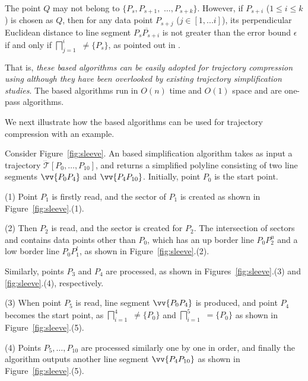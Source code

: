 The point $Q$ may not belong to $\{P_{s}, P_{s+1},$ $\ldots, P_{s+k}\}$.
However, if $P_{s+i}$ ($1\le i\le k$) is chosen as $Q$, then
for any data point $P_{s+j}$ ($j \in [1, ... i]$), its perpendicular Euclidean distance to
line segment $\overline{P_sP_{s+i}}$ is not greater than the error bound $\epsilon$ if and only if $\bigsqcap_{j=1}^{i}$ $\ne \{P_s\}$, as pointed out in \cite{Zhao:Sleeve}.

That is, {\em these \cia based algorithms can be easily adopted for trajectory compression using \ped although they have been overlooked by existing trajectory simplification studies}.
The \cia based algorithms run in $O(n)$ time and $O(1)$ space and are one-pass algorithms.

We next illustrate how the \cia based algorithms can be used for trajectory compression with an example.

\begin{example}
\label{exm-alg-sleeve}
Consider Figure~\ref{fig:sleeve}. An \cia based simplification algorithm takes as input a trajectory $\dddot{\mathcal{T}}[P_0, \ldots, P_{10}]$, and returns a simplified polyline consisting of two line segments $\vv{P_0P_4}$ and  $\vv{P_4P_{10}}$. Initially, point $P_0$ is the start point.

\sstab(1) Point $P_1$ is firstly read, and the sector  of $P_1$ is created as shown in Figure~\ref{fig:sleeve}.(1).

\sstab(2) Then $P_2$ is read, and the sector   is created for $P_2$. The intersection of sectors  and   contains data points other than $P_0$,  which has an up border line $P_0P_2^u$ and a low border line $P_0P_1^l$, as shown in Figure~\ref{fig:sleeve}.(2).

Similarly, points $P_3$ and $P_4$ are processed, as shown in Figures~\ref{fig:sleeve}.(3) and \ref{fig:sleeve}.(4), respectively.

\sstab(3) When point $P_5$ is read,  line segment $\vv{P_0P_4}$ is produced, and point $P_4$ becomes the start point, as $\bigsqcap_{i=1}^{4}$ $\ne\{P_0\}$ and $\bigsqcap_{i=1}^{5}$ $=\{P_0\}$ as shown in Figure~\ref{fig:sleeve}.(5).


\sstab(4) Points $P_5, \ldots, P_{10}$ are processed similarly one by one in order, and finally the algorithm outputs another line segment $\vv{P_4P_{10}}$ as shown in Figure~\ref{fig:sleeve}.(5). \eop
\end{example}


